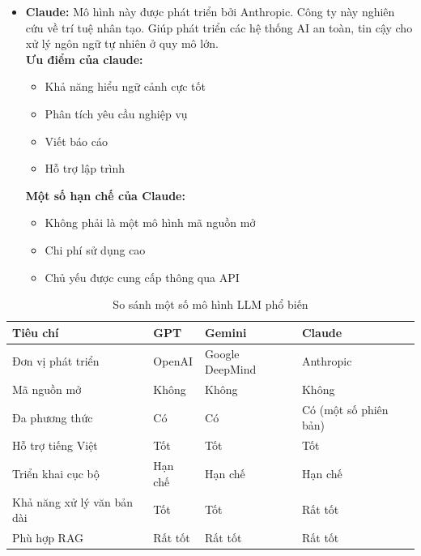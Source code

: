 \documentclass[../DoAn.tex]{subfiles}
\begin{document}
\begin{itemize}[label=-, leftmargin=*]
    \item \textbf{Claude:} Mô hình này được phát triển bởi Anthropic. Công ty này nghiên cứu về trí tuệ nhân tạo. Giúp phát triển các hệ thống AI an toàn, tin cậy cho xử lý ngôn ngữ tự nhiên ở quy mô lớn.\\
          \textbf{Ưu điểm của claude:}
          \begin{itemize}
              \item Khả năng hiểu ngữ cảnh cực tốt
              \item Phân tích yêu cầu nghiệp vụ
              \item Viết báo cáo
              \item Hỗ trợ lập trình
          \end{itemize}
          \textbf{Một số hạn chế của Claude:}
          \begin{itemize}
              \item Không phải là một mô hình mã nguồn mở
              \item Chi phí sử dụng cao
              \item Chủ yếu được cung cấp thông qua API
          \end{itemize}
\end{itemize}
\begin{table}[H]
    \centering
    \renewcommand{\arraystretch}{1.8} %
    \label{tab:llm_comparison}
    \begin{tabular}{|>{\centering\arraybackslash}m{3.5cm}|>{\centering\arraybackslash}m{4.5cm}|>{\centering\arraybackslash}m{3cm}|>{\centering\arraybackslash}m{3cm}|}        \hline
        \textbf{Tiêu chí}          & \textbf{GPT} & \textbf{Gemini} & \textbf{Claude}       \\
        \hline
        Đơn vị phát triển          & OpenAI       & Google DeepMind & Anthropic             \\
        \hline
        Mã nguồn mở                & Không        & Không           & Không                 \\
        \hline
        Đa phương thức             & Có           & Có              & Có (một số phiên bản) \\
        \hline
        Hỗ trợ tiếng Việt          & Tốt          & Tốt             & Tốt                   \\
        \hline
        Triển khai cục bộ          & Hạn chế      & Hạn chế         & Hạn chế               \\
        \hline
        Khả năng xử lý văn bản dài & Tốt          & Tốt             & Rất tốt               \\
        \hline
        Phù hợp RAG                & Rất tốt      & Rất tốt         & Rất tốt               \\
        \hline
    \end{tabular}
    \caption{So sánh một số mô hình LLM phổ biến}
\end{table}
\end{document}

